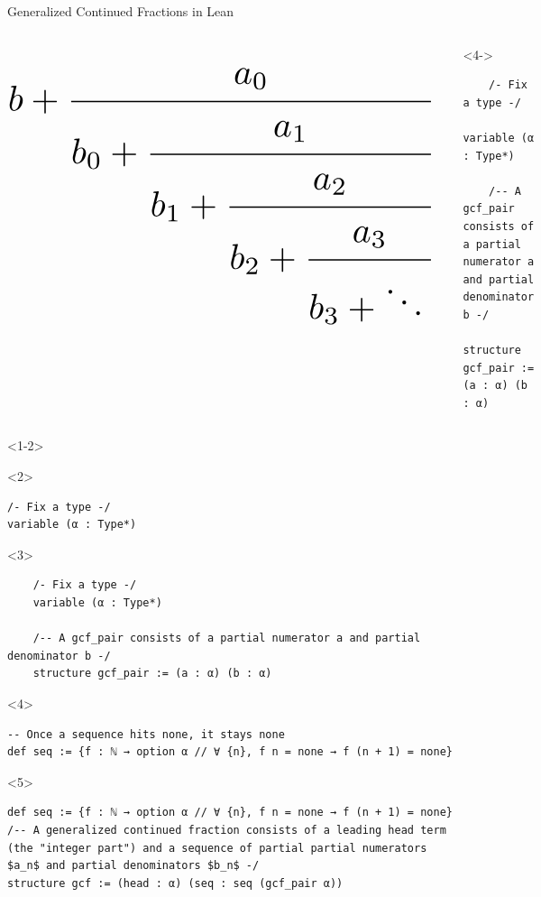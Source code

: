 \documentclass{beamer}
\begin{document}
\begin{frame}[fragile]{Generalized Continued Fractions in Lean}
\begin{columns}
\begin{equation*}
\resizebox{1\hsize}{!}{$
b + \cfrac{a_0}{b_0 + \cfrac{a_1}{b_1 + \cfrac{a_2}{b_2 + \cfrac{a_3}{b_3 + \ddots\,}}}}$
}
\end{equation*}
\pause
{}
\begin{onlyenv}<4->
    \begin{verbatim}
    /- Fix a type -/
    variable (α : Type*)

    /-- A gcf_pair consists of a partial numerator a and partial denominator b -/
    structure gcf_pair := (a : α) (b : α)
    \end{verbatim}   
\end{onlyenv}
\end{columns}
\begin{onlyenv}<1-2>
\begin{visibleenv}<2>
\begin{verbatim}
/- Fix a type -/
variable (α : Type*)
\end{verbatim}
\end{visibleenv}
\end{onlyenv}
\begin{onlyenv}<3>
    \begin{verbatim}
    /- Fix a type -/
    variable (α : Type*)

    /-- A gcf_pair consists of a partial numerator a and partial denominator b -/
    structure gcf_pair := (a : α) (b : α)
    \end{verbatim}   
\end{onlyenv}
\begin{onlyenv}<4>
\begin{verbatim}
-- Once a sequence hits none, it stays none
def seq := {f : ℕ → option α // ∀ {n}, f n = none → f (n + 1) = none}
\end{verbatim}
\end{onlyenv}
\begin{onlyenv}<5>
\begin{verbatim}
def seq := {f : ℕ → option α // ∀ {n}, f n = none → f (n + 1) = none}
/-- A generalized continued fraction consists of a leading head term (the "integer part") and a sequence of partial partial numerators $a_n$ and partial denominators $b_n$ -/
structure gcf := (head : α) (seq : seq (gcf_pair α))
\end{verbatim}
\end{onlyenv}
\end{frame}
\end{document}
